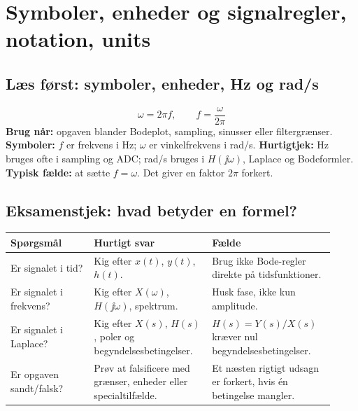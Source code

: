 \section{Symboler, enheder og signalregler, notation, units}

\subsection{Læs først: symboler, enheder, Hz og rad/s}
\[
\omega = 2\pi f,\qquad f=\frac{\omega}{2\pi}
\]
\textbf{Brug når:} opgaven blander Bodeplot, sampling, sinusser eller filtergrænser.
\textbf{Symboler:} \(f\) er frekvens i Hz; \(\omega\) er vinkelfrekvens i rad/s.
\textbf{Hurtigtjek:} Hz bruges ofte i sampling og ADC; rad/s bruges i \(H(\jj\omega)\), Laplace og Bodeformler.
\textbf{Typisk fælde:} at sætte \(f=\omega\). Det giver en faktor \(2\pi\) forkert.

\subsection{Eksamenstjek: hvad betyder en formel?}
\begin{tabular}{p{0.24\linewidth}p{0.34\linewidth}p{0.34\linewidth}}
\toprule
Spørgsmål & Hurtigt svar & Fælde\\
\midrule
Er signalet i tid? & Kig efter \(x(t)\), \(y(t)\), \(h(t)\). & Brug ikke Bode-regler direkte på tidsfunktioner.\\
Er signalet i frekvens? & Kig efter \(X(\omega)\), \(H(\jj\omega)\), spektrum. & Husk fase, ikke kun amplitude.\\
Er signalet i Laplace? & Kig efter \(X(s)\), \(H(s)\), poler og begyndelsesbetingelser. & \(H(s)=Y(s)/X(s)\) kræver nul begyndelsesbetingelser.\\
Er opgaven sandt/falsk? & Prøv at falsificere med grænser, enheder eller specialtilfælde. & Et næsten rigtigt udsagn er forkert, hvis én betingelse mangler.\\
\bottomrule
\end{tabular}

